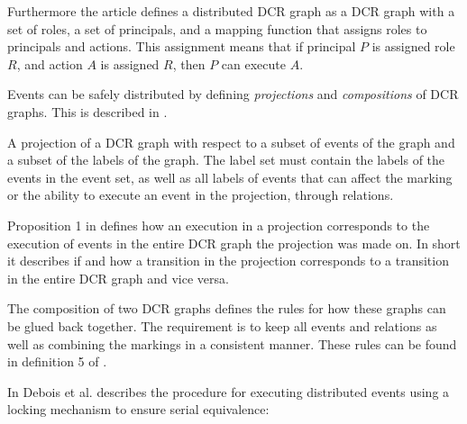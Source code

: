 	Furthermore the article defines a distributed DCR graph as a DCR graph with a set of roles, a set of principals, and a mapping function that assigns roles to principals and actions. This assignment means that if principal $P$ is assigned role $R$, and action $A$ is assigned $R$, then $P$ can execute $A$.
		
	\newpar
	Events can be safely distributed by defining \textit{projections} and \textit{compositions} of DCR graphs. This is described in \cite{hildebrandt2011safe}.
	
	\newpar
	A projection of a DCR graph with respect to a subset of events of the graph and a subset of the labels of the graph. The label set must contain the labels of the events in the event set, as well as all labels of events that can affect the marking or the ability to execute an event in the projection, through relations.
	
	\newpar
	Proposition 1 in \cite{hildebrandt2011safe} defines how an execution in a projection corresponds to the execution of events in the entire DCR graph the projection was made on. In short it describes if and how a transition in the projection corresponds to a transition in the entire DCR graph and vice versa.
	
	\newpar
	The composition of two DCR graphs defines the rules for how these graphs can be glued back together. The requirement is to keep all events and relations as well as combining the markings in a consistent manner. These rules can be found in definition 5 of \cite{hildebrandt2011safe}.
    
	\newpar 
	In \cite{debois2015concurrency} Debois et al. describes the procedure for executing distributed events using a locking mechanism to ensure serial equivalence:
	
